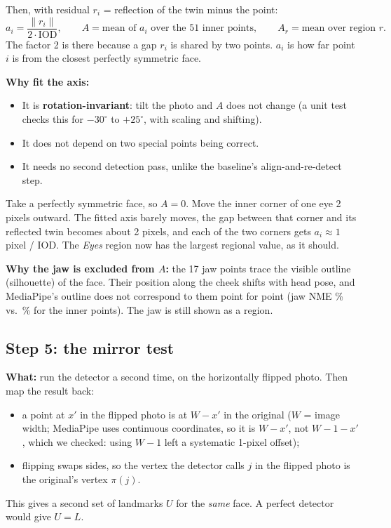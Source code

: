 Then, with residual $r_i$ = reflection of the twin minus the point:
\[ a_i=\frac{\|r_i\|}{2\cdot\text{IOD}}, \qquad A=\text{mean of } a_i \text{ over the 51 inner points}, \qquad A_r=\text{mean over region } r. \]
The factor 2 is there because a gap $r_i$ is shared by two points. $a_i$ is how far point
$i$ is from the closest perfectly symmetric face.

\textbf{Why fit the axis:}
\begin{itemize}
\item It is \textbf{rotation-invariant}: tilt the photo and $A$ does not change (a unit test checks this for $-30^\circ$ to $+25^\circ$, with scaling and shifting).
\item It does not depend on two special points being correct.
\item It needs no second detection pass, unlike the baseline's align-and-re-detect step.
\end{itemize}

\begin{idea}
Take a perfectly symmetric face, so $A=0$. Move the inner corner of one eye 2 pixels outward.
The fitted axis barely moves, the gap between that corner and its reflected twin becomes
about 2 pixels, and each of the two corners gets $a_i \approx 1$ pixel / IOD. The
\emph{Eyes} region now has the largest regional value, as it should.
\end{idea}

\textbf{Why the jaw is excluded from $A$:} the 17 jaw points trace the visible outline
(silhouette) of the face. Their position along the cheek shifts with head pose, and
MediaPipe's outline does not correspond to them point for point (jaw NME \nmeFitJaw\% vs.\
\nmeFitInner\% for the inner points). The jaw is still shown as a region.

\subsection{Step 5: the mirror test}
\textbf{What:} run the detector a second time, on the horizontally flipped photo. Then map
the result back:
\begin{itemize}
\item a point at $x'$ in the flipped photo is at $W-x'$ in the original ($W$ = image width;
MediaPipe uses continuous coordinates, so it is $W-x'$, not $W-1-x'$, which we checked:
using $W-1$ left a systematic 1-pixel offset);
\item flipping swaps sides, so the vertex the detector calls $j$ in the flipped photo is the
original's vertex $\pi(j)$.
\end{itemize}
This gives a second set of landmarks $U$ for the \emph{same} face. A perfect detector would give
$U=L$.


